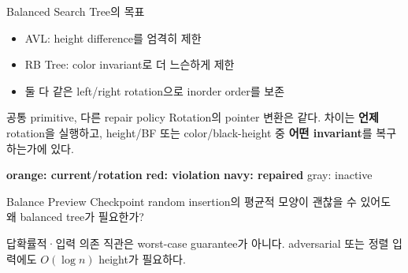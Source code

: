 \begin{frame}{Balanced Search Tree의 목표}
\begin{itemize}
\item AVL: height difference를 엄격히 제한
\item RB Tree: color invariant로 더 느슨하게 제한
\item 둘 다 같은 left/right rotation으로 inorder order를 보존
\end{itemize}
\begin{block}{공통 primitive, 다른 repair policy}
Rotation의 pointer 변환은 같다. 차이는 \textbf{언제} rotation을 실행하고,
height/BF 또는 color/black-height 중 \textbf{어떤 invariant}를 복구하는가에 있다.
\end{block}
\begin{center}\small
\textcolor{AlgoOrange}{\bfseries orange: current/rotation}\quad
\textcolor{red!75!black}{\bfseries red: violation}\quad
\textcolor{AlgoBlueTwo}{\bfseries navy: repaired}\quad
\textcolor{AlgoGray}{gray: inactive}
\end{center}
\end{frame}
\begin{frame}{Balance Preview Checkpoint}
random insertion의 평균적 모양이 괜찮을 수 있어도 왜 balanced tree가 필요한가?
\begin{exampleblock}{답}확률적·입력 의존 직관은 worst-case guarantee가 아니다. adversarial 또는 정렬 입력에도 $O(\log n)$ height가 필요하다.\end{exampleblock}
\end{frame}
